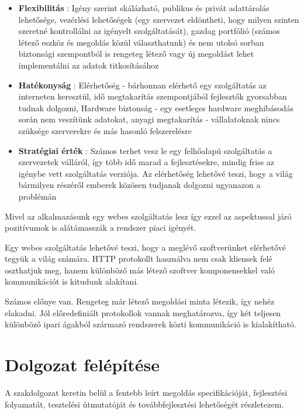  \begin{itemize}
	\item \textbf{Flexibilitás} : Igény szerint skálázható, publikus és privát adattárolás lehetősége, vezérlési lehetőségek (egy szervezet eldöntheti, hogy milyen szinten szeretné kontrollálni az igényelt szolgáltatását), gazdag portfólió (számos létező eszköz és megoldás közül választhatunk) és nem utolsó sorban biztonsági szempontból is rengeteg létező vagy új megoldást lehet implementálni az adatok titkosításához
	\item \textbf{Hatékonyság} : Elérhetőség - bárhonnan elérhető egy szolgáltatás az interneten keresztül, idő megtakarítás szempontjából fejlesztők gyorsabban tudnak dolgozni, Hardware biztonság - egy esetleges hardware meghibásodás során nem veszítünk adatokat, anyagi megtakarítás - vállalatoknak nincs szüksége szerverekre és más hasonló felszerelésre
	\item \textbf{Stratégiai érték} : Számos terhet vesz le egy felhőalapú szolgáltatás a szervezetek válláról, így több idő marad a fejlesztésekre, mindig friss az igénybe vett szolgáltatás verziója. Az elérhetőség lehetővé teszi, hogy a világ bármilyen részéről emberek közösen tudjanak dolgozni ugyanazon a problémán
\end{itemize}

Mivel az alkalmazásunk egy webes szolgáltatás lesz így ezzel az aspektussal járó pozitívumok is alátámasszák a rendszer piaci igényét.

Egy webes szolgáltatás lehetővé teszi, hogy a meglévő szoftverünket elérhetővé tegyük a világ számára\cite{tutorialspoint}. HTTP protokollt használva nem csak kliensek felé oszthatjuk meg, hanem különböző más létező szoftver komponensekkel való kommunikációt is kitudunk alakítani.

Számos előnye van. Rengeteg már létező megoldási minta létezik, így nehéz elakadni. Jól előredefiniált protokollok vannak meghatározva, így két teljesen különböző ipari ágakból származó rendszerek közti kommunikáció is kialakítható.

\section{Dolgozat felépítése}

A szakdolgozat keretin belül a fentebb leírt megoldás specifikációját, fejlesztési folyamatát, tesztelési útmutatóját és továbbfejlesztési lehetőségét részletezem.

